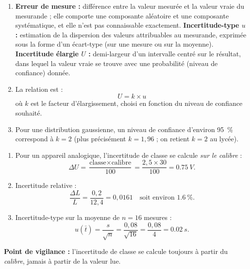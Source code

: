 \documentclass[11pt]{article}
\newcommand{\cle}[1]{{\popxbold\color{popdark}#1}}
\begin{document}
\begin{corrige}
\begin{enumerate}
\item \textbf{Erreur de mesure :} différence entre la valeur mesurée et la valeur vraie du mesurande ; elle comporte une composante aléatoire et une composante systématique, et elle n'est pas connaissable exactement.
\textbf{Incertitude-type $u$ :} estimation de la dispersion des valeurs attribuables au mesurande, exprimée sous la forme d'un écart-type (sur une mesure ou sur la moyenne).
\textbf{Incertitude élargie $U$ :} demi-largeur d'un intervalle centré sur le résultat, dans lequel la valeur vraie se trouve avec une probabilité (niveau de confiance) donnée.
\item La relation est :
\[ U = k \times u \]
où $k$ est le \cle{facteur d'élargissement}, choisi en fonction du niveau de confiance souhaité.
\item Pour une distribution gaussienne, un niveau de confiance d'environ \SI{95}{\%} correspond à $k = 2$ (plus précisément $k = 1{,}96$ ; on retient $k = 2$ au lycée).
\end{enumerate}
\end{corrige}

\begin{corrige}
\begin{enumerate}
\item Pour un appareil analogique, l'incertitude de classe se calcule \emph{sur le calibre} :
\[ \Delta U = \frac{\text{classe} \times \text{calibre}}{100} = \frac{2{,}5 \times 30}{100} = \SI{0,75}{V}. \]
\item Incertitude relative :
\[ \frac{\Delta L}{L} = \frac{0{,}2}{12{,}4} = 0{,}0161 \quad \text{soit environ } \SI{1,6}{\%}. \]
\item Incertitude-type sur la moyenne de $n = 16$ mesures :
\[ u(\bar{t}) = \frac{s}{\sqrt{n}} = \frac{0{,}08}{\sqrt{16}} = \frac{0{,}08}{4} = \SI{0,02}{s}. \]
\end{enumerate}
\textbf{Point de vigilance :} l'incertitude de classe se calcule toujours à partir du \emph{calibre}, jamais à partir de la valeur lue.
\end{corrige}
\end{document}
